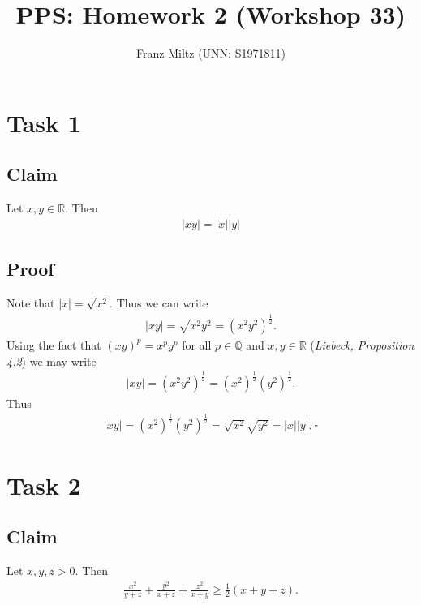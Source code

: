 \documentclass{article}
\title{PPS: Homework 2 (Workshop 33)}
\author{Franz Miltz (UNN: S1971811)}
\begin{document}
\maketitle
\section*{Task 1}
\subsection*{Claim}
Let $x,y\in\mathbb{R}$. Then
\begin{align*}
  |xy|=|x||y|
\end{align*}
\subsection*{Proof}
Note that $|x|=\sqrt{x^2}$. Thus we can write
\begin{align*}
  |xy|=\sqrt{x^2y^2}=(x^2y^2)^\frac{1}{2}.
\end{align*}
Using the fact that $(xy)^p=x^py^p$ for all $p\in\mathbb{Q}$ and $x,y\in\mathbb{R}$ (\emph{Liebeck, Proposition 4.2}) we may write
\begin{align*}
  |xy|=(x^2y^2)^\frac{1}{2}=(x^2)^\frac{1}{2}(y^2)^\frac{1}{2}.
\end{align*}
Thus
\begin{align*}
  |xy|=(x^2)^\frac{1}{2}(y^2)^\frac{1}{2}=\sqrt{x^2}\sqrt{y^2}=|x||y|.\:\square
\end{align*}
\section*{Task 2}
\subsection*{Claim} 
Let $x,y,z>0$. Then
\begin{align*}
  \frac{x^2}{y+z}+\frac{y^2}{x+z}+\frac{z^2}{x+y}\geq\frac{1}{2}(x+y+z).
\end{align*}
\end{document}
